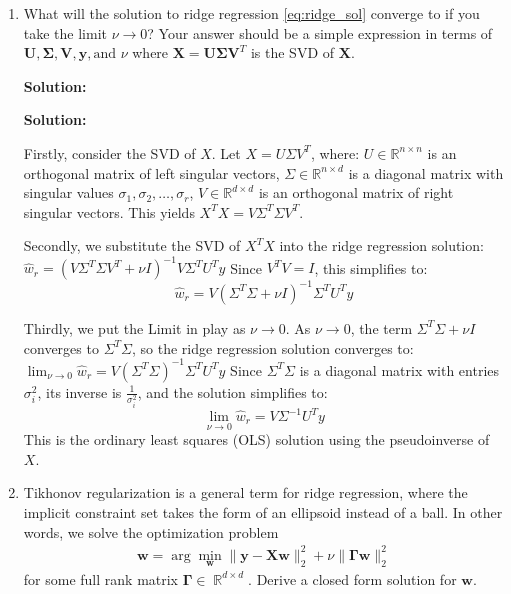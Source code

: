 \documentclass{article}
\newcommand{\mat}[1]{\mathbf{#1}}
\renewcommand{\vec}[1]{\boldsymbol{\mathbf{#1}}}
\DeclareMathOperator{\R}{\mathbb{R}}
\newenvironment{solution}{\color{blue} \smallskip \textbf{Solution:}}{}
\begin{document}
\begin{enumerate}
\begin{solution}
    \end{solution}

    \newpage
    \item What will the solution to ridge regression \eqref{eq:ridge_sol} converge to if you take the limit $\nu \rightarrow 0$? Your answer should be a simple expression in terms of $\mat{U}, \mat{\Sigma}, \mat{V}, \vec{y}, \text{and } \nu$ where $\mat{X} = \mat{U}\mat{\Sigma}\mat{V}^{T}$ is the SVD of $\mat{X}$.
    
    \begin{solution}

\textbf{Solution:}

Firstly, consider the SVD of \( X \). Let \( X = U \Sigma V^T \), where: \( U \in \mathbb{R}^{n \times n} \) is an orthogonal matrix of left singular vectors, \( \Sigma \in \mathbb{R}^{n \times d} \) is a diagonal matrix with singular values \( \sigma_1, \sigma_2, \dots, \sigma_r \), \( V \in \mathbb{R}^{d \times d} \) is an orthogonal matrix of right singular vectors. This yields \( X^T X = V \Sigma^T \Sigma V^T \).

Secondly, we substitute the SVD of \( X^T X \) into the ridge regression solution:
\(
\hat{w}_r = (V \Sigma^T \Sigma V^T + \nu I)^{-1} V \Sigma^T U^T y
\)
Since \( V^T V = I \), this simplifies to:
\[
\hat{w}_r = V (\Sigma^T \Sigma + \nu I)^{-1} \Sigma^T U^T y
\]

Thirdly, we put the Limit in play as \( \nu \to 0 \). As \( \nu \to 0 \), the term \( \Sigma^T \Sigma + \nu I \) converges to \( \Sigma^T \Sigma \), so the ridge regression solution converges to:
\(
\lim_{\nu \to 0} \hat{w}_r = V (\Sigma^T \Sigma)^{-1} \Sigma^T U^T y
\)
Since \( \Sigma^T \Sigma \) is a diagonal matrix with entries \( \sigma_i^2 \), its inverse is \( \frac{1}{\sigma_i^2} \), and the solution simplifies to:
\[
\lim_{\nu \to 0} \hat{w}_r = V \Sigma^{-1} U^T y
\]
This is the ordinary least squares (OLS) solution using the pseudoinverse of \( X \).



    \end{solution}

    \newpage
    \item Tikhonov regularization is a general term for ridge regression, where the implicit constraint set takes the form of an ellipsoid instead of a ball. In other words, we solve the optimization problem
    \begin{align*}
        \vec{w} = \arg\min_{\vec{w}} \|\vec{y} - \mat{X}\vec{w}\|_2^2 + \nu\|\mat{\Gamma}\vec{w}\|_2^2
    \end{align*}
    for some full rank matrix $\mat{\Gamma} \in \R^{d \times d}$. Derive a closed form solution for $\vec{w}$.
    

\end{enumerate}
\end{document}
